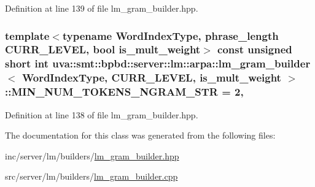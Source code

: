 Definition at line 139 of file lm\+\_\+gram\+\_\+builder.\+hpp.

\hypertarget{classuva_1_1smt_1_1bpbd_1_1server_1_1lm_1_1arpa_1_1lm__gram__builder_a42dd135ed8cb085d3fbd417a8bb45d1d}{}
\subsubsection[{M\+I\+N\+\_\+\+N\+U\+M\+\_\+\+T\+O\+K\+E\+N\+S\+\_\+\+N\+G\+R\+A\+M\+\_\+\+S\+T\+R}]{\setlength{\rightskip}{0pt plus 5cm}template$<$typename Word\+Index\+Type, phrase\+\_\+length C\+U\+R\+R\+\_\+\+L\+E\+V\+E\+L, bool is\+\_\+mult\+\_\+weight$>$ const unsigned short int {\bf uva\+::smt\+::bpbd\+::server\+::lm\+::arpa\+::lm\+\_\+gram\+\_\+builder}$<$ Word\+Index\+Type, C\+U\+R\+R\+\_\+\+L\+E\+V\+E\+L, is\+\_\+mult\+\_\+weight $>$\+::M\+I\+N\+\_\+\+N\+U\+M\+\_\+\+T\+O\+K\+E\+N\+S\+\_\+\+N\+G\+R\+A\+M\+\_\+\+S\+T\+R = 2\hspace{0.3cm}{\ttfamily [static]}, {\ttfamily [protected]}}\label{classuva_1_1smt_1_1bpbd_1_1server_1_1lm_1_1arpa_1_1lm__gram__builder_a42dd135ed8cb085d3fbd417a8bb45d1d}


Definition at line 138 of file lm\+\_\+gram\+\_\+builder.\+hpp.



The documentation for this class was generated from the following files\+:\begin{DoxyCompactItemize}
\item 
inc/server/lm/builders/\hyperlink{lm__gram__builder_8hpp}{lm\+\_\+gram\+\_\+builder.\+hpp}\item 
src/server/lm/builders/\hyperlink{lm__gram__builder_8cpp}{lm\+\_\+gram\+\_\+builder.\+cpp}\end{DoxyCompactItemize}
